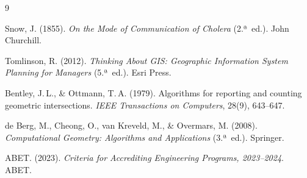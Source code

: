 \documentclass[12pt, oneside]{article}
\begin{document}
\begin{thebibliography}{9}

  Snow, J. (1855).
  \textit{On the Mode of Communication of Cholera} (2.ª~ed.).
  John Churchill.

  Tomlinson, R. (2012).
  \textit{Thinking About GIS: Geographic Information System Planning
  for Managers} (5.ª~ed.).
  Esri Press.

  Bentley, J.\,L., \& Ottmann, T.\,A. (1979).
  Algorithms for reporting and counting geometric intersections.
  \textit{IEEE Transactions on Computers}, 28(9), 643--647.

  de Berg, M., Cheong, O., van Kreveld, M., \& Overmars, M. (2008).
  \textit{Computational Geometry: Algorithms and Applications}
  (3.ª~ed.).
  Springer.

  ABET. (2023).
  \textit{Criteria for Accrediting Engineering Programs, 2023--2024}.
  ABET.

\end{thebibliography}
\end{document}

